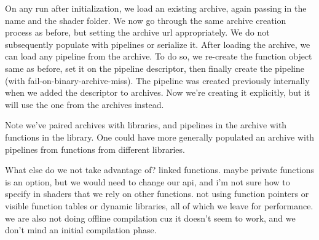 On any run after initialization, we load an existing archive, again passing in the name and the shader folder.
We now go through the same archive creation process as before, but setting the archive url appropriately.
We do not subsequently populate with pipelines or serialize it.
After loading the archive, we can load any pipeline from the archive.
To do so, we re-create the function object same as before, set it on the pipeline descriptor, then finally create the pipeline (with fail-on-binary-archive-miss). The pipeline was created previously internally when we added the descriptor to archives. Now we're creating it explicitly, but it will use the one from the archives instead.

Note we've paired archives with libraries, and pipelines in the archive with functions in the library.
One could have more generally populated an archive with pipelines from functions from different libraries. 

What else do we not take advantage of?
linked functions. maybe private functions is an option, but we would need to change our api, and i'm not sure how to specify in shaders that we rely on other functions. not using function pointers or visible function tables or dynamic libraries, all of which we leave for performance. 
we are also not doing offline compilation cuz it doesn't seem to work, and we don't mind an initial compilation phase. 
